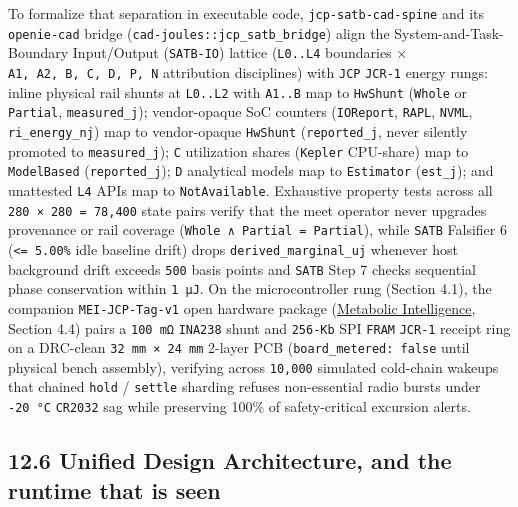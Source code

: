 \documentclass[10pt,letterpaper]{article}
\begin{document}
To formalize that separation in executable code,
\texttt{jcp-\allowbreak{}satb-\allowbreak{}cad-\allowbreak{}spine} and its \texttt{openie-cad} bridge
(\texttt{cad-\allowbreak{}joules::jcp\_\allowbreak{}satb\_\allowbreak{}bridge}) align the
System-and-Task-Boundary Input/Output (\texttt{SATB-IO}) lattice
(\texttt{L0..L4} boundaries × \texttt{A1,\allowbreak{}\ A2,\allowbreak{}\ B,\allowbreak{}\ C,\allowbreak{}\ D,\allowbreak{}\ P,\allowbreak{}\ N}
attribution disciplines) with \texttt{JCP} \texttt{JCR-1} energy rungs:
inline physical rail shunts at \texttt{L0..L2} with \texttt{A1..B} map
to \texttt{HwShunt} (\texttt{Whole} or \texttt{Partial},
\texttt{measured\_j}); vendor-opaque SoC counters (\texttt{IOReport},
\texttt{RAPL}, \texttt{NVML}, \texttt{ri\_energy\_nj}) map to
vendor-opaque \texttt{HwShunt} (\texttt{reported\_j}, never silently
promoted to \texttt{measured\_j}); \texttt{C} utilization shares
(\texttt{Kepler} CPU-share) map to \texttt{ModelBased}
(\texttt{reported\_j}); \texttt{D} analytical models map to
\texttt{Estimator} (\texttt{est\_j}); and unattested \texttt{L4} APIs
map to \texttt{NotAvailable}. Exhaustive property tests across all
\texttt{280\ ×\ 280\ =\ 78,\allowbreak{}400} state pairs verify that the meet
operator never upgrades provenance or rail coverage
(\texttt{Whole\ ∧\ Partial\ =\ Partial}), while \texttt{SATB} Falsifier
6 (\texttt{\textless{}=\ 5.00\%} idle baseline drift) drops
\texttt{derived\_\allowbreak{}marginal\_\allowbreak{}uj} whenever host background drift exceeds
\texttt{500} basis points and \texttt{SATB} Step 7 checks sequential
phase conservation within \texttt{1\ µJ}. On the microcontroller rung
(Section 4.1), the companion \texttt{MEI-JCP-Tag-v1} open hardware
package (\href{https://research.openie.dev/products/mei/}{Metabolic
Intelligence}, Section 4.4) pairs a \texttt{100\ mΩ} \texttt{INA238}
shunt and \texttt{256-Kb} SPI \texttt{FRAM} \texttt{JCR-1} receipt ring
on a DRC-clean \texttt{32\ mm\ ×\ 24\ mm} 2-layer PCB
(\texttt{board\_\allowbreak{}metered:\ false} until physical bench assembly),
verifying across \texttt{10,000} simulated cold-chain wakeups that
chained \texttt{hold} / \texttt{settle} sharding refuses non-essential
radio bursts under \texttt{-20\ °C} \texttt{CR2032} sag while preserving
100\% of safety-critical excursion alerts.

\subsection{12.6 Unified Design Architecture, and the runtime that is
seen}\label{unified-design-architecture-and-the-runtime-that-is-seen}
\end{document}
